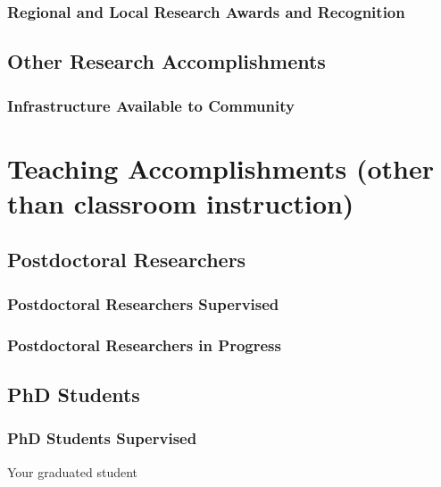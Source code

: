 \subsubsection{Regional and Local Research Awards and Recognition}

\subsection{Other Research Accomplishments}

\subsubsection{Infrastructure Available to Community}

\section{Teaching Accomplishments (other than classroom instruction)}

\subsection{Postdoctoral Researchers}
\subsubsection{Postdoctoral Researchers Supervised}
\subsubsection{Postdoctoral Researchers in Progress}

\subsection{PhD Students}

\subsubsection{PhD Students Supervised}
\begin{myenum}
  \item Your graduated student
\end{myenum}

